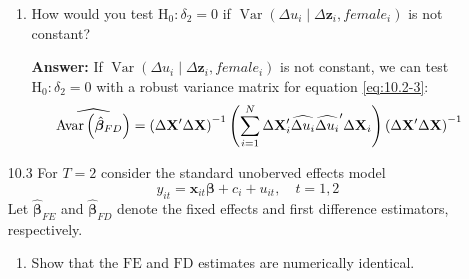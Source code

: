 \documentclass[UTF8]{article} %
\begin{document}
\begin{enumerate}
\begin{enumerate}
        \item How would you test $\mathrm{H}_{0}: \delta_{2}=0$ if $\operatorname{Var}\left(\Delta u_{i} \mid \Delta \mathbf{z}_{i}, female_{i}\right)$ is not constant?
        
        \textbf{Answer:} If $\operatorname{Var}\left(\Delta u_{i} \mid \Delta \mathbf{z}_{i}, female_{i}\right)$ is not constant, we can test $\mathrm{H}_0: \delta_2 = 0$ with a robust variance matrix for equation \eqref{eq:10.2-3}:
        \[ \widehat{\mathrm{Avar}\left(\hat{\boldsymbol{\beta}}_{F D}\right)}=\left(\Delta \mathbf{X}^{\prime} \Delta \mathbf{X}\right)^{-1}\left(\sum_{i=1}^{N} \Delta \mathbf{X}_{i}^{\prime} \widehat{\Delta u_i} \widehat{\Delta u_i}^{\prime} \Delta \mathbf{X}_{i}\right)\left(\Delta \mathbf{X}^{\prime} \Delta \mathbf{X}\right)^{-1} \]
    \end{enumerate}
    
    
    \item[10.3] For $T=2$ consider the standard unoberved effects model
    \[ y_{i t}=\mathbf{x}_{i t} \boldsymbol{\beta}+c_{i}+u_{i t}, \quad t=1,2 \]
    Let $\hat{\boldsymbol{\beta}}_{F E}$ and $\hat{\boldsymbol{\beta}}_{F D}$ denote the fixed effects and first difference estimators, respectively.
    
    \begin{enumerate}
        \item Show that the $\mathrm{FE}$ and $\mathrm{FD}$ estimates are numerically identical.
        

\end{enumerate}
\end{enumerate}
\end{document}
